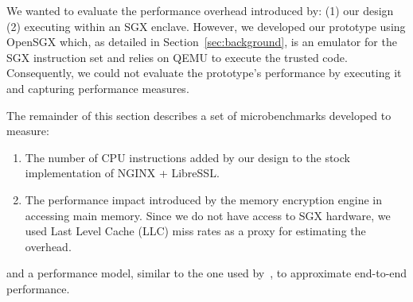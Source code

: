 \documentclass[../../main.tex]{subfiles}
\begin{document}
We wanted to evaluate the performance overhead introduced by: (1) our
design (2) executing within an SGX enclave. However, we developed our
prototype using OpenSGX which, as detailed in
Section~\ref{sec:background}, is an emulator for the SGX instruction
set and relies on QEMU to execute the trusted code. Consequently, we
could not evaluate the prototype's performance by executing it and
capturing performance measures.

The remainder of this section describes a set of microbenchmarks
developed to measure:
\begin{enumerate}
  \item The number of CPU instructions added by our design to the
    stock implementation of NGINX + LibreSSL.
  \item The performance impact introduced by the memory encryption
    engine in accessing main memory. Since we do not have access to SGX
    hardware, we used Last Level Cache (LLC) miss rates as a proxy for estimating the
    overhead.    
\end{enumerate}
and a performance model, similar to the one used by~\cite{Baumann14},
to approximate end-to-end performance.
\end{document}
